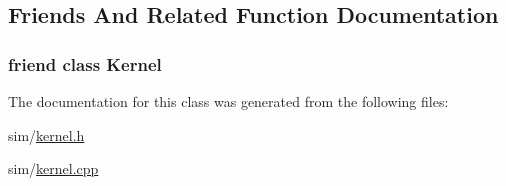 \subsection{Friends And Related Function Documentation}
\hypertarget{class_simulator_1_1_clock_a3807a3ebd0e05ca8cb4d928025a943d2}{
\subsubsection[{Kernel}]{\setlength{\rightskip}{0pt plus 5cm}friend class {\bf Kernel}\hspace{0.3cm}{\ttfamily [friend]}}}\label{class_simulator_1_1_clock_a3807a3ebd0e05ca8cb4d928025a943d2}


The documentation for this class was generated from the following files\+:\begin{DoxyCompactItemize}
\item 
sim/\hyperlink{kernel_8h}{kernel.\+h}\item 
sim/\hyperlink{kernel_8cpp}{kernel.\+cpp}\end{DoxyCompactItemize}
